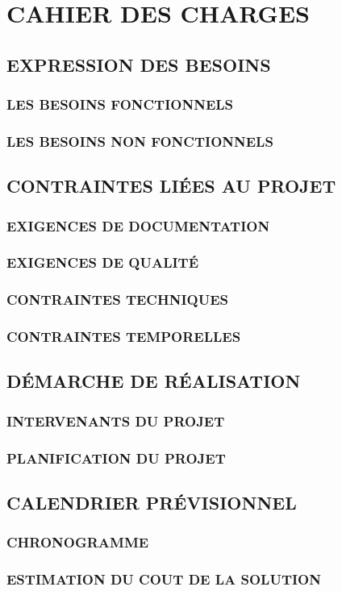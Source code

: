 \chapter{CAHIER DES CHARGES}


\section{EXPRESSION DES BESOINS}
 \subsection{LES BESOINS FONCTIONNELS}
 \subsection{LES BESOINS NON FONCTIONNELS}

 \section{CONTRAINTES LIÉES AU PROJET}
 \subsection{EXIGENCES DE DOCUMENTATION}
 \subsection{EXIGENCES DE QUALITÉ}
 \subsection{CONTRAINTES TECHNIQUES}
 \subsection{CONTRAINTES TEMPORELLES}
   
   
 \section{DÉMARCHE DE RÉALISATION}
 \subsection{INTERVENANTS DU PROJET}
 \subsection{PLANIFICATION DU PROJET}
  
  \section{CALENDRIER PRÉVISIONNEL}
  \subsection{CHRONOGRAMME}
  \subsection{ESTIMATION DU COUT DE LA SOLUTION}
